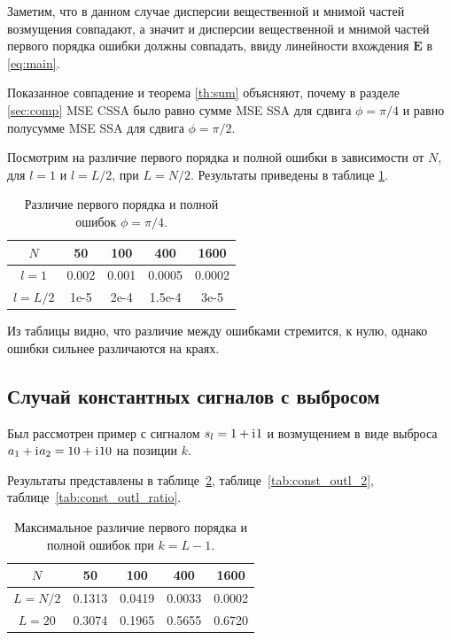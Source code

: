 \documentclass[specialist,
               substylefile = spbu.rtx,
               subf,href,colorlinks=true, 12pt]{disser}
\begin{document}
Заметим, что в данном случае дисперсии вещественной и мнимой частей возмущения совпадают, а значит и дисперсии вещественной и мнимой частей первого порядка ошибки должны совпадать, ввиду линейности вхождения $\mathbf{E}$ в \eqref{eq:main}.

Показанное совпадение и теорема \ref{th:sum} объясняют, почему в разделе \ref{sec:comp} MSE CSSA было равно сумме MSE SSA для сдвига $\phi = \pi/4$ и равно полусумме MSE SSA для сдвига $\phi = \pi/2$.

Посмотрим на различие первого порядка и полной ошибки в зависимости от $N$, для $l = 1$ и $l = L / 2$, при $L = N / 2$. Результаты приведены в таблице \ref{tab:harm_conv_comp}. 

\begin{table}[H]
	\begin{center}
		\caption{Различие первого порядка и полной ошибок $\phi = \pi/4$.}
		\label{tab:harm_conv_comp}
		\begin{tabular}{|c|c|c|c|c|}
			\hline
			$N$	& 50 & 100 & 400 & 1600 \\
			\hline
			$l = 1$ & 0.002  & 0.001  & 0.0005 & 0.0002 \\
			\hline
			$l = L / 2$ & 1e-5  & 2e-4  & 1.5e-4 & 3e-5 \\
			\hline
		\end{tabular}
	\end{center}
\end{table}

Из таблицы видно, что различие между ошибками стремится, к нулю, однако ошибки сильнее различаются на краях.

\subsection{Случай константных сигналов с выбросом}

Был рассмотрен пример с сигналом $s_l = 1 + \mathrm{i}\mkern1mu 1$ и возмущением в виде выброса $a_1 + \mathrm{i}\mkern1mu a_2 = 10 + \mathrm{i}\mkern1mu 10$ на позиции $k$.

Результаты представлены в таблице~\ref{tab:const_outl_1}, таблице~\ref{tab:const_outl_2}, таблице~\ref{tab:const_outl_ratio}.

\begin{table}[H]
	\begin{center}
		\caption{Максимальное различие первого порядка и полной ошибок при $k = L - 1$.}
		\label{tab:const_outl_1}
		\begin{tabular}{|c|c|c|c|c|}
			\hline
			$N$	& 50 & 100 & 400 & 1600 \\
			\hline
			$L = N / 2$ & 0.1313  & 0.0419  & 0.0033 & 0.0002 \\
			\hline
			$L = 20$ & 0.3074  & 0.1965  & 0.5655 & 0.6720 \\
			\hline
		\end{tabular}
	\end{center}
\end{table}
\end{document}
